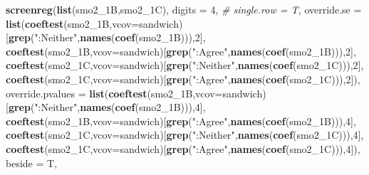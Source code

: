 \documentclass[
]{article}
\newenvironment{Shaded}{\begin{snugshade}}{\end{snugshade}}
\newcommand{\CommentTok}[1]{\textcolor[rgb]{0.56,0.35,0.01}{\textit{#1}}}
\newcommand{\DataTypeTok}[1]{\textcolor[rgb]{0.13,0.29,0.53}{#1}}
\newcommand{\DecValTok}[1]{\textcolor[rgb]{0.00,0.00,0.81}{#1}}
\newcommand{\KeywordTok}[1]{\textcolor[rgb]{0.13,0.29,0.53}{\textbf{#1}}}
\newcommand{\NormalTok}[1]{#1}
\newcommand{\StringTok}[1]{\textcolor[rgb]{0.31,0.60,0.02}{#1}}
\begin{document}
\begin{Shaded}
\begin{Highlighting}[]
\KeywordTok{screenreg}\NormalTok{(}\KeywordTok{list}\NormalTok{(smo2_1B,smo2_1C), }\DataTypeTok{digits =} \DecValTok{4}\NormalTok{, }\CommentTok{# single.row = T,}
          \DataTypeTok{override.se =} \KeywordTok{list}\NormalTok{(}\KeywordTok{coeftest}\NormalTok{(smo2_1B,}\DataTypeTok{vcov=}\NormalTok{sandwich)[}\KeywordTok{grep}\NormalTok{(}\StringTok{":Neither"}\NormalTok{,}\KeywordTok{names}\NormalTok{(}\KeywordTok{coef}\NormalTok{(smo2_1B))),}\DecValTok{2}\NormalTok{],}
                             \KeywordTok{coeftest}\NormalTok{(smo2_1B,}\DataTypeTok{vcov=}\NormalTok{sandwich)[}\KeywordTok{grep}\NormalTok{(}\StringTok{":Agree"}\NormalTok{,}\KeywordTok{names}\NormalTok{(}\KeywordTok{coef}\NormalTok{(smo2_1B))),}\DecValTok{2}\NormalTok{],}
                             \KeywordTok{coeftest}\NormalTok{(smo2_1C,}\DataTypeTok{vcov=}\NormalTok{sandwich)[}\KeywordTok{grep}\NormalTok{(}\StringTok{":Neither"}\NormalTok{,}\KeywordTok{names}\NormalTok{(}\KeywordTok{coef}\NormalTok{(smo2_1C))),}\DecValTok{2}\NormalTok{],}
                             \KeywordTok{coeftest}\NormalTok{(smo2_1C,}\DataTypeTok{vcov=}\NormalTok{sandwich)[}\KeywordTok{grep}\NormalTok{(}\StringTok{":Agree"}\NormalTok{,}\KeywordTok{names}\NormalTok{(}\KeywordTok{coef}\NormalTok{(smo2_1C))),}\DecValTok{2}\NormalTok{]),}
          \DataTypeTok{override.pvalues =} \KeywordTok{list}\NormalTok{(}\KeywordTok{coeftest}\NormalTok{(smo2_1B,}\DataTypeTok{vcov=}\NormalTok{sandwich)[}\KeywordTok{grep}\NormalTok{(}\StringTok{":Neither"}\NormalTok{,}\KeywordTok{names}\NormalTok{(}\KeywordTok{coef}\NormalTok{(smo2_1B))),}\DecValTok{4}\NormalTok{],}
                                  \KeywordTok{coeftest}\NormalTok{(smo2_1B,}\DataTypeTok{vcov=}\NormalTok{sandwich)[}\KeywordTok{grep}\NormalTok{(}\StringTok{":Agree"}\NormalTok{,}\KeywordTok{names}\NormalTok{(}\KeywordTok{coef}\NormalTok{(smo2_1B))),}\DecValTok{4}\NormalTok{],}
                                  \KeywordTok{coeftest}\NormalTok{(smo2_1C,}\DataTypeTok{vcov=}\NormalTok{sandwich)[}\KeywordTok{grep}\NormalTok{(}\StringTok{":Neither"}\NormalTok{,}\KeywordTok{names}\NormalTok{(}\KeywordTok{coef}\NormalTok{(smo2_1C))),}\DecValTok{4}\NormalTok{],}
                                  \KeywordTok{coeftest}\NormalTok{(smo2_1C,}\DataTypeTok{vcov=}\NormalTok{sandwich)[}\KeywordTok{grep}\NormalTok{(}\StringTok{":Agree"}\NormalTok{,}\KeywordTok{names}\NormalTok{(}\KeywordTok{coef}\NormalTok{(smo2_1C))),}\DecValTok{4}\NormalTok{]),}
          \DataTypeTok{beside =}\NormalTok{ T,}

\end{Highlighting}
\end{Shaded}
\end{document}
